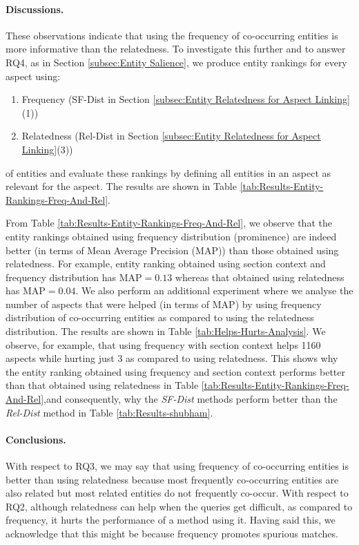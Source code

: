 \paragraph{\textbf{Discussions.}}
These observations indicate that using the frequency of co-occurring entities is more informative than the relatedness. To investigate this further and to answer RQ4, as in Section \ref{subsec:Entity Salience}, we produce entity rankings for every aspect using:
\begin{enumerate}
    \item Frequency (SF-Dist in Section \ref{subsec:Entity Relatedness for Aspect Linking}(1))
    \item Relatedness (Rel-Dist in Section \ref{subsec:Entity Relatedness for Aspect Linking}(3))
\end{enumerate}
of entities and evaluate these rankings by defining all entities in an aspect as relevant for the aspect. The results are shown in Table \ref{tab:Results-Entity-Rankings-Freq-And-Rel}.

From Table \ref{tab:Results-Entity-Rankings-Freq-And-Rel}, we observe that the entity rankings obtained using frequency distribution (prominence) are indeed better (in terms of Mean Average Precision (MAP)) than those obtained using relatedness. For example, entity ranking obtained using section context and frequency distribution has $\text{MAP}=0.13$ whereas that obtained using relatedness has $\text{MAP}=0.04$. We also perform an additional experiment where we analyse the number of aspects that were helped (in terms of MAP) by using frequency distribution of co-occurring entities as compared to using the relatedness distribution. The results are shown in Table \ref{tab:Helps-Hurts-Analysis}. We observe, for example, that using frequency with section context helps 1160 aspects while hurting just 3 as compared to using relatedness. This shows why the entity ranking obtained using frequency and section context performs better than that obtained using relatedness in Table \ref{tab:Results-Entity-Rankings-Freq-And-Rel},and consequently, why the \textit{SF-Dist} methods perform better than the \textit{Rel-Dist} method in Table \ref{tab:Results-shubham}.

\paragraph{\textbf{Conclusions.}}
With respect to RQ3, we may say that using frequency of co-occurring entities is better than using relatedness because most frequently co-occurring entities are also related but most related entities do not frequently co-occur. With respect to RQ2, although relatedness can help when the queries get difficult, as compared to frequency, it hurts the performance of a method using it. Having said this, we acknowledge that this might be because frequency promotes spurious matches.

